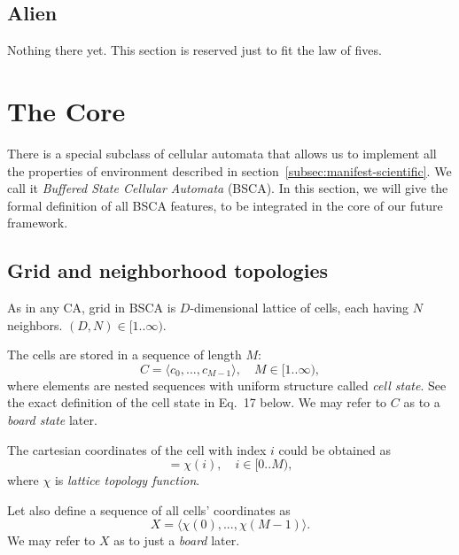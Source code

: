 \documentclass[a4paper,12pt,tikz,UTF8]{article}
\begin{document}
  \subsection{Alien}

  Nothing there yet. This section is reserved just to fit the law of fives. 

  \newpage

  \section{The Core}
  \label{sec:the-core}

  There is a special subclass of cellular automata that allows us to implement all the properties of environment described in section~\ref{subsec:manifest-scientific}. We call it \textit{Buffered State Cellular Automata} (BSCA). In this section, we will give the formal definition of all BSCA features, to be integrated in the core of our future framework.

  \subsection{Grid and neighborhood topologies}

    As in any CA, grid in BSCA is $D$-dimensional lattice of cells, each having $N$ neighbors. $(D, N) \in [1 .. \infty)$.

    The cells are stored in a sequence of length $M$:
    \begin{equation}
      \label{eq:cells}
      C = \langle c_0, ..., c_{M - 1} \rangle, \quad M \in {[1 .. \infty)},
    \end{equation}
    where elements are nested sequences with uniform structure called \textit{cell state}. See the exact definition of the cell state in Eq.~17 below. We may refer to $C$ as to a \textit{board state} later.

    The cartesian coordinates of the cell with index $i$ could be obtained as 
    \begin{equation}
      [ x_0, ..., x_{D - 1} ] = \chi(i), \quad i \in {[0 .. M)},
    \end{equation}
    where $\chi$ is \textit{lattice topology function}. 

    Let also define a sequence of all cells' coordinates as 
    \begin{equation}
      X = \langle \chi(0), ..., \chi(M - 1) \rangle.
    \end{equation}
    We may refer to $X$ as to just a \textit{board} later.
\end{document}
